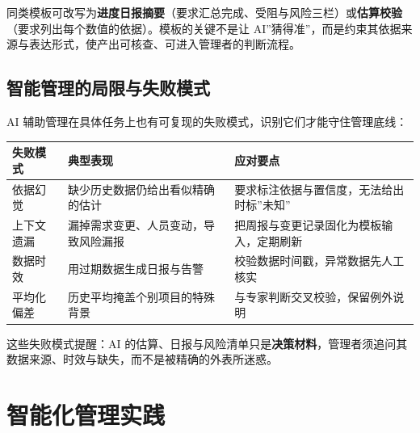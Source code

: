 \documentclass[12pt,a4paper,twoside,openany]{ctexbook}
\numberwithin{figure}{chapter}
\numberwithin{table}{chapter}
\newcounter{none}
\begin{document}
同类模板可改写为\textbf{进度日报摘要}（要求汇总完成、受阻与风险三栏）或\textbf{估算校验}（要求列出每个数值的依据）。模板的关键不是让
AI''猜得准''，而是约束其依据来源与表达形式，使产出可核查、可进入管理者的判断流程。

\subsection{智能管理的局限与失败模式}\label{ux667aux80fdux7ba1ux7406ux7684ux5c40ux9650ux4e0eux5931ux8d25ux6a21ux5f0f}

AI 辅助管理在具体任务上也有可复现的失败模式，识别它们才能守住管理底线：

{\def\LTcaptype{none} %
\begin{longtable}[]{@{}
  >{\raggedright\arraybackslash}p{}
  >{\raggedright\arraybackslash}p{}
  >{\raggedright\arraybackslash}p{}@{}}
\toprule\noalign{}
\begin{minipage}[b]{\linewidth}\raggedright
失败模式
\end{minipage} & \begin{minipage}[b]{\linewidth}\raggedright
典型表现
\end{minipage} & \begin{minipage}[b]{\linewidth}\raggedright
应对要点
\end{minipage} \\
\midrule\noalign{}
\endhead
\bottomrule\noalign{}
\endlastfoot
依据幻觉 & 缺少历史数据仍给出看似精确的估计 &
要求标注依据与置信度，无法给出时标''未知'' \\
上下文遗漏 & 漏掉需求变更、人员变动，导致风险漏报 &
把周报与变更记录固化为模板输入，定期刷新 \\
数据时效 & 用过期数据生成日报与告警 &
校验数据时间戳，异常数据先人工核实 \\
平均化偏差 & 历史平均掩盖个别项目的特殊背景 &
与专家判断交叉校验，保留例外说明 \\
\end{longtable}
}

这些失败模式提醒：AI
的估算、日报与风险清单只是\textbf{决策材料}，管理者须追问其数据来源、时效与缺失，而不是被精确的外表所迷惑。

\section{智能化管理实践}\label{ux667aux80fdux5316ux7ba1ux7406ux5b9eux8df5}
\end{document}
